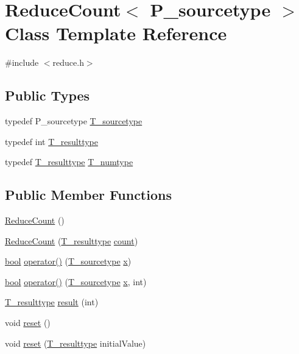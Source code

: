 \hypertarget{classReduceCount}{}\section{Reduce\+Count$<$ P\+\_\+sourcetype $>$ Class Template Reference}
\label{classReduceCount}


{\ttfamily \#include $<$reduce.\+h$>$}

\subsection*{Public Types}
\begin{DoxyCompactItemize}
\item 
typedef P\+\_\+sourcetype \hyperlink{classReduceCount_a53a44049c4d2c0d0ce458c62ec9a6b29}{T\+\_\+sourcetype}
\item 
typedef int \hyperlink{classReduceCount_aeca4c153ec33e643b9104184d7d7d240}{T\+\_\+resulttype}
\item 
typedef \hyperlink{classReduceCount_aeca4c153ec33e643b9104184d7d7d240}{T\+\_\+resulttype} \hyperlink{classReduceCount_a5167d1d7427f26f792d3fa26e77f9a1a}{T\+\_\+numtype}
\end{DoxyCompactItemize}
\subsection*{Public Member Functions}
\begin{DoxyCompactItemize}
\item 
\hyperlink{classReduceCount_a793bc2c350a7476c8771d71604a275b5}{Reduce\+Count} ()
\item 
\hyperlink{classReduceCount_ae01d86addf8a4834605bf700f92b7b88}{Reduce\+Count} (\hyperlink{classReduceCount_aeca4c153ec33e643b9104184d7d7d240}{T\+\_\+resulttype} \hyperlink{veccount_8cc_ae61b582e808f50a28a8baebd2395ee7d}{count})
\item 
\hyperlink{compiler_8h_abb452686968e48b67397da5f97445f5b}{bool} \hyperlink{classReduceCount_a97f2f333be0c101a17356917af095e65}{operator()} (\hyperlink{classReduceCount_a53a44049c4d2c0d0ce458c62ec9a6b29}{T\+\_\+sourcetype} \hyperlink{vecnorm1_8cc_ac73eed9e41ec09d58f112f06c2d6cb63}{x})
\item 
\hyperlink{compiler_8h_abb452686968e48b67397da5f97445f5b}{bool} \hyperlink{classReduceCount_a669f7de9f9aeb6fa35e9a69ef40f3210}{operator()} (\hyperlink{classReduceCount_a53a44049c4d2c0d0ce458c62ec9a6b29}{T\+\_\+sourcetype} \hyperlink{vecnorm1_8cc_ac73eed9e41ec09d58f112f06c2d6cb63}{x}, int)
\item 
\hyperlink{classReduceCount_aeca4c153ec33e643b9104184d7d7d240}{T\+\_\+resulttype} \hyperlink{classReduceCount_a0baf28e598f68833b0fe9e210772939f}{result} (int)
\item 
void \hyperlink{classReduceCount_a72ae7dcb03fe7888e6d10244f4e9f0ec}{reset} ()
\item 
void \hyperlink{classReduceCount_a4a7b68abad69ea52b50051feef259900}{reset} (\hyperlink{classReduceCount_aeca4c153ec33e643b9104184d7d7d240}{T\+\_\+resulttype} initial\+Value)
\end{DoxyCompactItemize}
